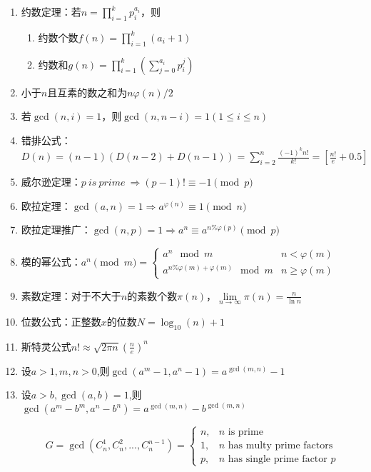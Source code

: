 \begin{enumerate}
\item 约数定理：若$n=\prod_{i=1}^kp_i^{a_i}$，则

\begin{enumerate}
\item 约数个数$f(n)=\prod_{i=1}^k(a_i+1)$
\item 约数和$g(n)=\prod_{i=1}^k(\sum_{j=0}^{a_i}p_i^j)$
\end{enumerate}

\item 小于$n$且互素的数之和为$n\varphi(n)/2$

\item 若$\gcd(n,i)=1$，则$\gcd(n,n-i)=1(1\leq i\leq n)$

\item 错排公式：$D(n)=(n-1)(D(n-2)+D(n-1))=\sum_{i=2}^n\frac{(-1)^kn!}{k!}=[\frac{n!}{e}+0.5]$

\item 威尔逊定理：$p\ is\ prime\ \Rightarrow (p-1)!\equiv-1\pmod p$

\item 欧拉定理：$\gcd(a,n)=1\Rightarrow a^{\varphi(n)}\equiv1\pmod n$

\item 欧拉定理推广：$\gcd(n,p)=1\Rightarrow a^n\equiv a^{n\%\varphi(p)}\pmod p$

\item 模的幂公式：$a ^ n \pmod {m} = 
\begin{cases}
a ^ n \mod m & n < \varphi(m)\\
a ^ {n \% \varphi(m) + \varphi(m)} \mod m & n \ge \varphi(m)
\end{cases}
$

\item 素数定理：对于不大于$n$的素数个数$\pi(n)$，$\lim\limits_{n\to\infty}\pi(n)=\frac{n}{\ln n}$

\item 位数公式：正整数$x$的位数$N=\log_{10}(n)+1$

\item 斯特灵公式$n!\approx\sqrt{2\pi n}(\frac{n}{e})^n$

\item 设$a>1,m,n>0$,则$\gcd(a^m-1,a^n-1)=a^{\gcd(m,n)}-1$

\item 设$a>b,\gcd(a,b)=1$,则$\gcd(a^m-b^m,a^n-b^n)=a^{\gcd(m,n)}-b^{\gcd(m,n)}$

$$
G=\gcd(C_n^1,C_n^2,...,C_n^{n-1})=
\begin{cases}
	n, & \text{$n$ is prime} \\
	1, & \text{$n$ has multy prime factors} \\
	p, & \text{$n$ has single prime factor $p$}
\end{cases}
$$


\end{enumerate}
